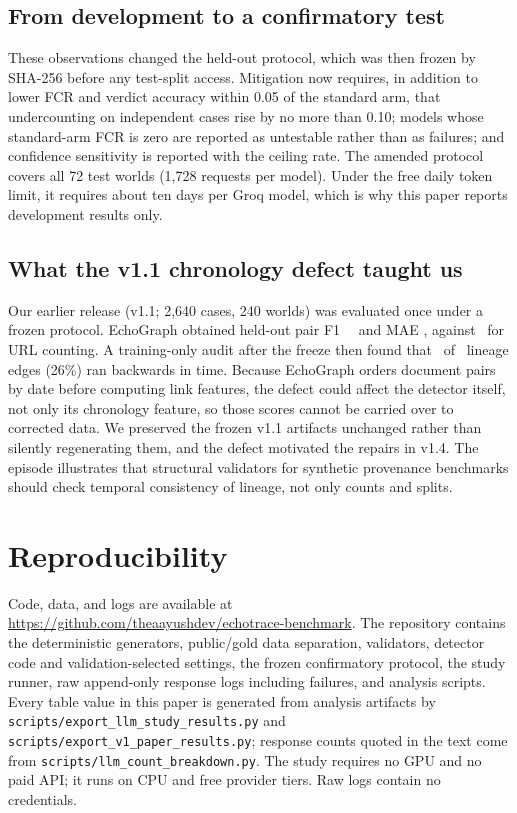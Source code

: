 \documentclass[11pt]{article}
\newcommand{\code}[1]{\texttt{#1}}
\begin{document}
\subsection{From development to a confirmatory test}\label{sec:confirm}
These observations changed the held-out protocol, which was then frozen by SHA-256 before any
test-split access. Mitigation now
requires, in addition to lower FCR and verdict accuracy within 0.05 of the standard arm, that
undercounting on independent cases rise by no more than 0.10; models whose standard-arm FCR is zero
are reported as untestable rather than as failures; and confidence sensitivity is reported with
the ceiling rate. The amended protocol covers all 72 test worlds (1,728 requests per model). Under
the free daily token limit, it requires about ten days per Groq model, which is why this paper
reports development results only.

\subsection{What the v1.1 chronology defect taught us}\label{sec:v11}
Our earlier release (v1.1; 2,640 cases, 240 worlds) was evaluated once under a frozen protocol.
EchoGraph obtained held-out pair F1 \EchoFOne\ \EchoFOneCI\ and MAE \EchoMAE, against \UrlFOne\ for
URL counting. A training-only audit after the freeze then found that \ChronReversed\ of
\ChronEdges\ lineage edges (26\%) ran backwards in time. Because EchoGraph orders document pairs by
date before computing link features, the defect could affect the detector itself, not only its
chronology feature, so those scores cannot be carried over to corrected data. We preserved the
frozen v1.1 artifacts unchanged rather than silently regenerating them, and the defect motivated
the repairs in v1.4. The episode illustrates that structural validators for synthetic provenance
benchmarks should check temporal consistency of lineage, not only counts and splits.

\section{Reproducibility}
Code, data, and logs are available at
\url{https://github.com/theaayushdev/echotrace-benchmark}. The repository contains the deterministic generators, public/gold data separation, validators,
detector code and validation-selected settings, the frozen confirmatory protocol,
the study runner, raw append-only response logs including failures, and analysis scripts. Every
table value in this paper is generated from analysis artifacts by
\code{scripts/export\_llm\_study\_results.py} and \code{scripts/export\_v1\_paper\_results.py};
response counts quoted in the text come from \code{scripts/llm\_count\_breakdown.py}. The study requires no GPU and no paid API; it runs on
CPU and free provider tiers. Raw logs contain no credentials.
\end{document}
